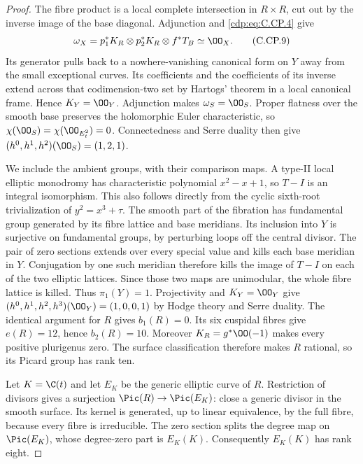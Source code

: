 \begin{proof}
The fibre product is a local complete intersection in
$R\times R$, cut out by the inverse image of the base
diagonal. Adjunction and \eqref{cdp:eq:C.CP.4} give
\[
 \omega_X=p_1^*K_R\otimes p_2^*K_R\otimes f^*T_B
                         \simeq\OO_X.
 \tag{C.CP.9}\label{cdp:eq:C.CP.9}
\]
Its generator pulls back to a nowhere-vanishing canonical
form on $Y$ away from the small exceptional curves.
Its coefficients and the coefficients of its inverse
extend across that codimension-two set by Hartogs'
theorem in a local canonical frame. Hence $K_Y=\OO_Y$.
Adjunction makes $\omega_S=\OO_S$. Proper flatness over
the smooth base preserves the holomorphic Euler
characteristic, so $\chi(\OO_S)=\chi(\OO_{E_t^2})=0$.
Connectedness and Serre duality then give
$(h^0,h^1,h^2)(\OO_S)=(1,2,1)$.

We include the ambient groups, with their comparison
maps. A type-II local elliptic monodromy has characteristic
polynomial $x^2-x+1$, so $T-I$ is an integral isomorphism.
This also follows directly from the cyclic sixth-root
trivialization of $y^2=x^3+\tau$. The smooth part of
the fibration has fundamental group generated by its
fibre lattice and base meridians. Its inclusion into
$Y$ is surjective on fundamental groups, by perturbing
loops off the central divisor. The pair of zero sections
extends over every special value and kills each base
meridian in $Y$. Conjugation by one such meridian
therefore kills the image of $T-I$ on each of the two
elliptic lattices. Since those two maps are unimodular,
the whole fibre lattice is killed. Thus $\pi_1(Y)=1$.
Projectivity and $K_Y=\OO_Y$ give
$(h^0,h^1,h^2,h^3)(\OO_Y)=(1,0,0,1)$ by Hodge theory
and Serre duality. The identical argument for $R$ gives
$b_1(R)=0$. Its six cuspidal fibres give $e(R)=12$,
hence $b_2(R)=10$. Moreover $K_R=g^*\OO(-1)$ makes
every positive plurigenus zero. The surface classification
therefore makes $R$ rational, so its Picard group has
rank ten.

Let $K=\C(t)$ and let $E_K$ be the generic elliptic
curve of $R$. Restriction of divisors gives a surjection
$\Pic(R)\to\Pic(E_K)$: close a generic divisor in the
smooth surface. Its kernel is generated, up to linear
equivalence, by the full fibre, because every fibre is
irreducible. The zero section splits the degree map on
$\Pic(E_K)$, whose degree-zero part is $E_K(K)$.
Consequently $E_K(K)$ has rank eight.


\end{proof}
